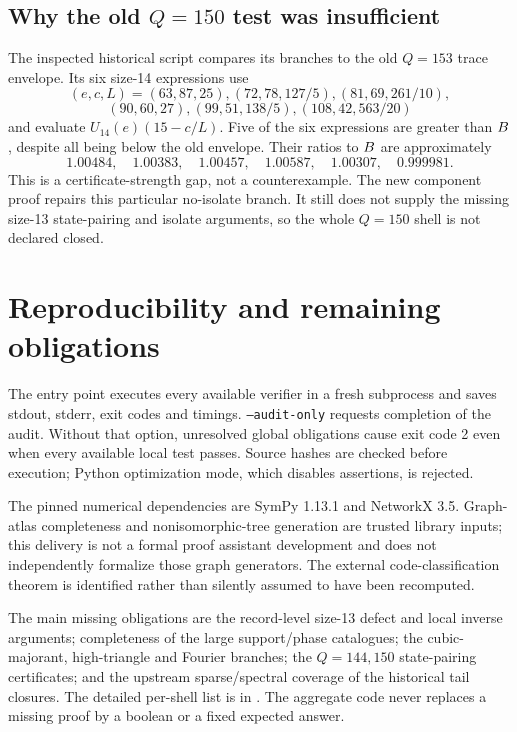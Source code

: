 \documentclass[11pt,a4paper]{article}
\newcommand{\file}[1]{\path{#1}}
\begin{document}
\subsection{Why the old $Q=150$ test was insufficient}
The inspected historical script compares its branches to the old $Q=153$ trace envelope. Its six size-14 expressions use
\[
 (e,c,L)=(63,87,25),(72,78,127/5),(81,69,261/10),
\]
\[
 (90,60,27),(99,51,138/5),(108,42,563/20)
\]
and evaluate $U_{14}(e)(15-c/L)$. Five of the six expressions are greater than $B$, despite all being below the old envelope. Their ratios to $B$ are approximately
\[
 1.00484,\quad1.00383,\quad1.00457,\quad1.00587,\quad1.00307,\quad0.999981.
\]
This is a certificate-strength gap, not a counterexample. The new component proof repairs this particular no-isolate branch. It still does not supply the missing size-13 state-pairing and isolate arguments, so the whole $Q=150$ shell is not declared closed.

\section{Reproducibility and remaining obligations}
The entry point \file{run_all.py} executes every available verifier in a fresh subprocess and saves stdout, stderr, exit codes and timings. \texttt{--audit-only} requests completion of the audit. Without that option, unresolved global obligations cause exit code 2 even when every available local test passes. Source hashes are checked before execution; Python optimization mode, which disables assertions, is rejected.

The pinned numerical dependencies are SymPy 1.13.1 and NetworkX 3.5. Graph-atlas completeness and nonisomorphic-tree generation are trusted library inputs; this delivery is not a formal proof assistant development and does not independently formalize those graph generators. The external code-classification theorem is identified rather than silently assumed to have been recomputed.

The main missing obligations are the record-level size-13 defect and local inverse arguments; completeness of the large support/phase catalogues; the cubic-majorant, high-triangle and Fourier branches; the $Q=144,150$ state-pairing certificates; and the upstream sparse/spectral coverage of the historical tail closures. The detailed per-shell list is in \file{report/remaining_obligations.md}. The aggregate code never replaces a missing proof by a boolean or a fixed expected answer.
\end{document}
